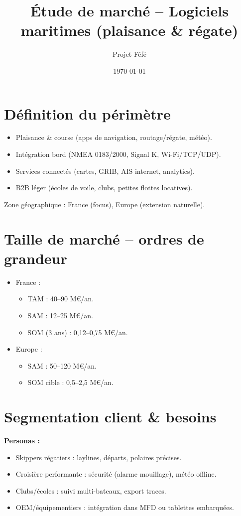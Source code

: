 \documentclass[12pt,a4paper]{article}
\title{Étude de marché -- Logiciels maritimes (plaisance \& régate)}
\author{Projet Féfé}
\date{\today}
\begin{document}
\maketitle

\tableofcontents
\newpage

\section{Définition du périmètre}
\begin{itemize}
  \item Plaisance \& course (apps de navigation, routage/régate, météo).
  \item Intégration bord (NMEA 0183/2000, Signal K, Wi-Fi/TCP/UDP).
  \item Services connectés (cartes, GRIB, AIS internet, analytics).
  \item B2B léger (écoles de voile, clubs, petites flottes locatives).
\end{itemize}
Zone géographique : France (focus), Europe (extension naturelle).

\section{Taille de marché -- ordres de grandeur}
\begin{itemize}
  \item France : 
    \begin{itemize}
      \item TAM : 40--90 M€/an.
      \item SAM : 12--25 M€/an.
      \item SOM (3 ans) : 0,12--0,75 M€/an.
    \end{itemize}
  \item Europe : 
    \begin{itemize}
      \item SAM : 50--120 M€/an.
      \item SOM cible : 0,5--2,5 M€/an.
    \end{itemize}
\end{itemize}

\section{Segmentation client \& besoins}
\textbf{Personas :}
\begin{itemize}
  \item Skippers régatiers : laylines, départs, polaires précises.
  \item Croisière performante : sécurité (alarme mouillage), météo offline.
  \item Clubs/écoles : suivi multi-bateaux, export traces.
  \item OEM/équipementiers : intégration dans MFD ou tablettes embarquées.
\end{itemize}
\end{document}
